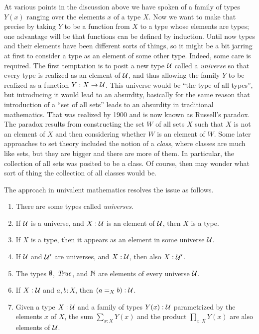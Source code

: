 At various points in the discussion above we have spoken of a family of types $Y(x)$ ranging over the elements $x$ of a type $X$.  Now we want
to make that precise by taking $Y$ to be a function from $X$ to a type whose elements are types; one advantage will be that functions can be
defined by induction.  Until now types and their elements have been different sorts of things, so it might be a bit jarring at first to consider
a type as an element of some other type. Indeed, some care is required.  The first temptation is to posit a new type $\mathcal{U}$ called a {\em
  universe} so that every type is realized as an element of $\mathcal{U}$, and thus allowing the family $Y$ to be realized as a function $Y : X \to
\mathcal{U}$.  This universe would be ``the type of all types'', but introducing it would lead to an absurdity, basically for the same reason that
introduction of a ``set of all sets'' leads to an absurdity in traditional mathematics.  That was realized by 1900 and is now known as Russell's
paradox.  The paradox results from constructing the set $W$ of all sets $X$ such that $X$ is not an element of $X$ and then considering whether
$W$ is an element of $W$.  Some later approaches to set theory included the notion of a {\em class}, where classes are much like sets, but they
are bigger and there are more of them.  In particular, the collection of all sets was posited to be a class.  Of course, then may wonder what
sort of thing the collection of all classes would be.

The approach in univalent mathematics resolves the issue as follows.

\begin{enumerate}
\item There are some types called {\em universes}.
\item If $\mathcal{U}$ is a universe, and $X : \mathcal{U}$ is an element of $\mathcal{U}$, then $X$ is a type.
\item If $X$ is a type, then it appears as an element in some universe $\mathcal{U}$.
\item If $\mathcal{U}$ and $\mathcal{U}'$ are universes, and $X:\mathcal{U}$, then also $X:\mathcal{U}'$.
\item The types $\emptyset$, $\mathop{\mathit{True}}$, and $\mathbb{N}$ are elements of every universe $\mathcal{U}$.
\item If $X : \mathcal{U}$ and $a,b:X$, then $(a = _X b) : \mathcal{U}$.  
\item Given a type $X:\mathcal{U}$ and a family of types $Y(x):\mathcal{U}$ parametrized by the elements $x$ of $X$, the sum $\sum_{x:X} Y(x)$ and the product
  $\prod_{x:X} Y(x)$ are also elements of $\mathcal{U}$.
\end{enumerate}


